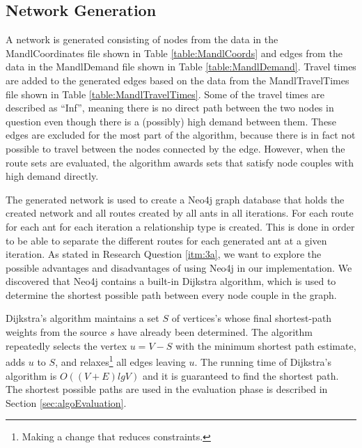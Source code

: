 \subsection{Network Generation}
\label{subsec:networkGeneration}
A network is generated consisting of nodes from the data in the MandlCoordinates file shown in Table \vref{table:MandlCoords} and edges from the data in the MandlDemand file shown in Table \vref{table:MandlDemand}. Travel times are added to the generated edges based on the data from the MandlTravelTimes file shown in Table \vref{table:MandlTravelTimes}. Some of the travel times are described as ``Inf'', meaning there is no direct path between the two nodes in question even though there is a (possibly) high demand between them. These edges are excluded for the most part of the algorithm, because there is in fact not possible to travel between the nodes connected by the edge. However, when the route sets are evaluated, the algorithm awards sets that satisfy node couples with high demand directly. 

The generated network is used to create a Neo4j graph database that holds the created network and all routes created by all ants in all iterations. For each route for each ant for each iteration a relationship type is created. This is done in order to be able to separate the different routes for each generated ant at a given iteration. As stated in Research Question \vref{itm:3a}, we want to explore the possible advantages and disadvantages of using Neo4j in our implementation. We discovered that Neo4j contains a built-in Dijkstra algorithm, which is used to determine the shortest possible path between every node couple in the graph. 

Dijkstra's algorithm \citet[p.658-662]{cormen09} maintains a set $S$ of vertices's whose final shortest-path weights from the source $s$ have already been determined. The algorithm repeatedly selects the vertex $u = V - S$ with the minimum shortest path estimate, adds $u$ to $S$, and relaxes\footnote{Making a change that reduces constraints.} all edges leaving $u$. The running time of Dijkstra's algorithm is $O((V + E)lg V)$ and it is guaranteed to find the shortest path\citep[p.~661]{cormen09}. The shortest possible paths are used in the evaluation phase is described in Section \vref{sec:algoEvaluation}. 
